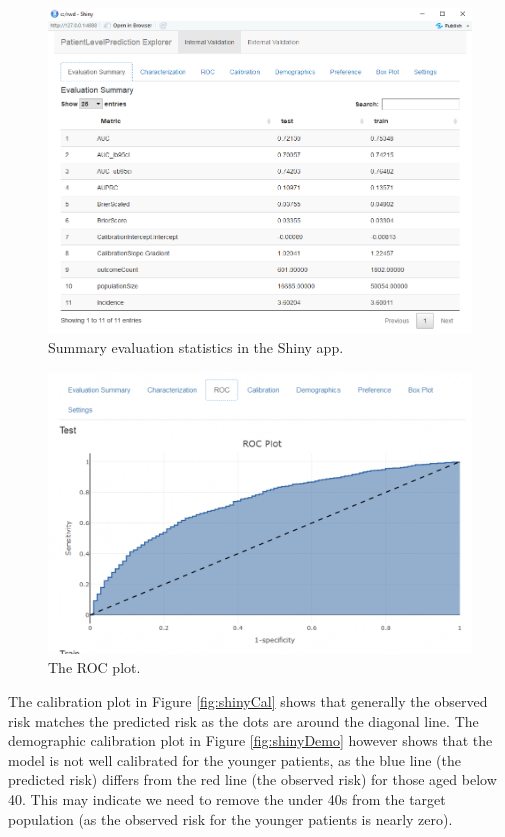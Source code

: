\documentclass[11pt]{book}
\theoremstyle{definition}
\theoremstyle{definition}
\theoremstyle{definition}
\theoremstyle{remark}
\begin{document}
\begin{figure}
\includegraphics[width=1\linewidth]{images/PatientLevelPrediction/shinysummary} \caption{Summary evaluation statistics in the Shiny app.}\label{fig:shinySummary}
\end{figure}

\begin{figure}

{\centering \includegraphics[width=1\linewidth]{images/PatientLevelPrediction/shiny/singleShiny/singleShinyRoc} 

}

\caption{The ROC plot.}\label{fig:shinyROC}
\end{figure}

The calibration plot in Figure \ref{fig:shinyCal} shows that generally the observed risk matches the predicted risk as the dots are around the diagonal line. The demographic calibration plot in Figure \ref{fig:shinyDemo} however shows that the model is not well calibrated for the younger patients, as the blue line (the predicted risk) differs from the red line (the observed risk) for those aged below 40. This may indicate we need to remove the under 40s from the target population (as the observed risk for the younger patients is nearly zero).
\end{document}
